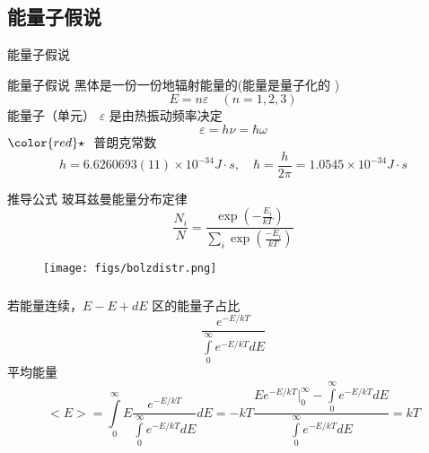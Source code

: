 \subsection{能量子假说}
\begin{frame}{能量子假说}
    \begin{atcbox}{能量子假说}
    黑体是一份一份地辐射能量的(能量是量子化的
    )
    \begin{equation}
        E=n\varepsilon \quad (n=1,2,3)
    \end{equation}
    能量子（单元）  $\varepsilon$ 是由热振动频率决定
    \begin{equation}
        \varepsilon=h\nu = \hbar \omega
    \end{equation}
    ${\color{red}\star}~$ 普朗克常数 $$h=6.6260693(11)\times 10^{-34} J\cdot s,\quad \hbar=\frac{h}{2\pi}= 1.0545\times 10^{-34} J\cdot s$$
    \end{atcbox}
\end{frame}

\begin{frame} {推导公式}
    玻耳兹曼能量分布定律
    \begin{equation*}
        \frac{N_{i}}{N}=\frac{\exp \left(-\frac{E_{i}}{k T}\right)}{\sum_{i} \exp \left(\frac{-E_{i}}{k T}\right)}
    \end{equation*}
    \begin{figure}[htbp]
        \centering
        \texttt{[image: figs/bolzdistr.png]}
    \end{figure}
\end{frame}

\begin{frame}
    \frametitle{}
    {\Bullet} 若能量连续，$E - E+ dE$ 区的能量子占比
    \begin{equation*}
        \frac{e^{-E / k T}}{\int\limits_{0}^{\infty} e^{-E / k T} d E}
    \end{equation*}  
    平均能量 
    \begin{equation*}
        <E>=\int\limits_{0}^{\infty} E \frac{e^{-E / k T}}{\int\limits_{0}^{\infty} e^{-E / k T} d E} d E = -kT \frac{Ee^{-E / k T}\vert_0 ^\infty-\int\limits_{0}^{\infty} e^{-E / k T} d E } {\int\limits_{0}^{\infty} e^{-E / k T} d E }= kT
    \end{equation*}
\end{frame}

